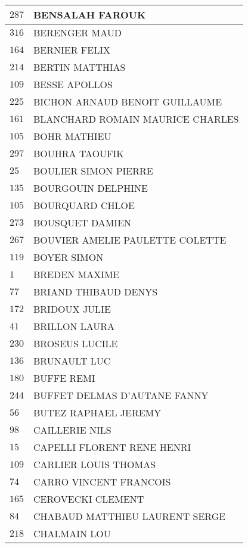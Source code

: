 \begin{xltabular}{\linewidth}{|l|X|}
    \hline
    $287$ & BENSALAH FAROUK \\
    \hline
    $316$ & BERENGER MAUD \\
    \hline
    $164$ & BERNIER FELIX \\
    \hline
    $214$ & BERTIN MATTHIAS \\
    \hline
    $109$ & BESSE APOLLOS \\
    \hline
    $225$ & BICHON ARNAUD BENOIT GUILLAUME \\
    \hline
    $161$ & BLANCHARD ROMAIN MAURICE CHARLES \\
    \hline
    $105$ & BOHR MATHIEU \\
    \hline
    $297$ & BOUHRA TAOUFIK \\
    \hline
    $25$ & BOULIER SIMON PIERRE \\
    \hline
    $135$ & BOURGOUIN DELPHINE \\
    \hline
    $105$ & BOURQUARD CHLOE \\
    \hline
    $273$ & BOUSQUET DAMIEN \\
    \hline
    $267$ & BOUVIER AMELIE PAULETTE COLETTE \\
    \hline
    $119$ & BOYER SIMON \\
    \hline
    $1$ & BREDEN MAXIME \\
    \hline
    $77$ & BRIAND THIBAUD DENYS \\
    \hline
    $172$ & BRIDOUX JULIE \\
    \hline
    $41$ & BRILLON LAURA \\
    \hline
    $230$ & BROSEUS LUCILE \\
    \hline
    $136$ & BRUNAULT LUC \\
    \hline
    $180$ & BUFFE REMI \\
    \hline
    $244$ & BUFFET DELMAS D'AUTANE FANNY \\
    \hline
    $56$ & BUTEZ RAPHAEL JEREMY \\
    \hline
    $98$ & CAILLERIE NILS \\
    \hline
    $15$ & CAPELLI FLORENT RENE HENRI \\
    \hline
    $109$ & CARLIER LOUIS THOMAS \\
    \hline
    $74$ & CARRO VINCENT FRANCOIS \\
    \hline
    $165$ & CEROVECKI CLEMENT \\
    \hline
    $84$ & CHABAUD MATTHIEU LAURENT SERGE \\
    \hline
    $218$ & CHALMAIN LOU \\

\end{xltabular}
